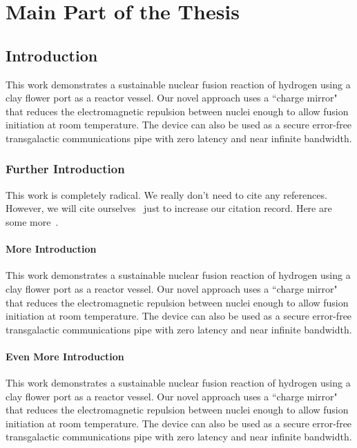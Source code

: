 \chapter{Main Part of the Thesis}
\section{\label{sec:intro}Introduction}
This work demonstrates a sustainable nuclear fusion reaction of hydrogen 
using a clay flower port as a reactor vessel. Our novel approach uses
a ``charge mirror" that reduces the electromagnetic repulsion between 
nuclei enough to allow fusion initiation at room temperature.
The device can also be used as a secure error-free transgalactic communications
pipe with zero latency and near infinite bandwidth.   

\subsection{\label{sec:intro:further}Further Introduction}
This work is completely radical.  We really don't need to cite any 
references.  However, we will cite ourselves~\cite{epr35,feyn54,feynman59} 
just to increase our citation record.  Here are some 
more~\cite{einstein67,bell24,bell34}.

\subsubsection{\label{sec:intro:further:more}More Introduction}
This work demonstrates a sustainable nuclear fusion reaction of hydrogen 
using a clay flower port as a reactor vessel. Our novel approach uses
a ``charge mirror" that reduces the electromagnetic repulsion between 
nuclei enough to allow fusion initiation at room temperature.
The device can also be used as a secure error-free transgalactic communications
pipe with zero latency and near infinite bandwidth.   

\subsubsection{\label{sec:intro:further:evenmore}Even More Introduction}
This work demonstrates a sustainable nuclear fusion reaction of hydrogen 
using a clay flower port as a reactor vessel. Our novel approach uses
a ``charge mirror" that reduces the electromagnetic repulsion between 
nuclei enough to allow fusion initiation at room temperature.
The device can also be used as a secure error-free transgalactic communications
pipe with zero latency and near infinite bandwidth.   

